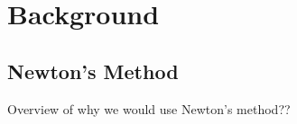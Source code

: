 
\chapter{Background} %

\label{Chapter2} %


\section{Newton's Method} \label{Sect:Newton'sMethod}
Overview of why we would use Newton's method??

